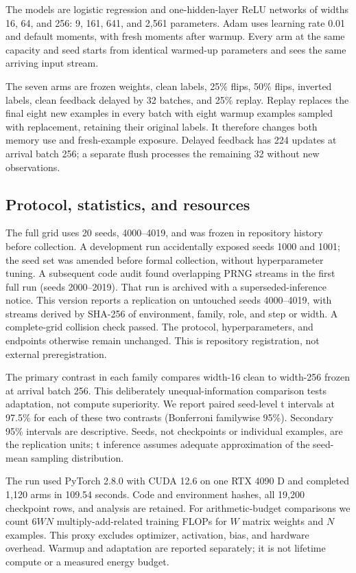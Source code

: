 \documentclass[11pt]{article}
\begin{document}
The models are logistic regression and one-hidden-layer ReLU networks of
widths 16, 64, and 256: 9, 161, 641, and 2,561 parameters. Adam uses learning
rate 0.01 and default moments, with fresh moments after warmup. Every arm at
the same capacity and seed starts from identical warmed-up parameters and
sees the same arriving input stream.

The seven arms are frozen weights, clean labels, 25\% flips, 50\% flips,
inverted labels, clean feedback delayed by 32 batches, and 25\% replay.
Replay replaces the final eight new examples in every batch with eight
warmup examples sampled with replacement, retaining their original labels.
It therefore changes both memory use and fresh-example exposure. Delayed
feedback has 224 updates at arrival batch 256; a separate flush processes
the remaining 32 without new observations.

\subsection{Protocol, statistics, and resources}
The full grid uses 20 seeds, 4000--4019, and was frozen in repository history
before collection. A development run accidentally exposed seeds 1000 and 1001;
the seed set was amended before formal collection, without hyperparameter
tuning. A subsequent code audit found overlapping PRNG streams in the first
full run (seeds 2000--2019). That run is archived with a superseded-inference
notice. This version reports a replication on untouched seeds 4000--4019,
with streams derived by SHA-256 of environment, family, role, and step or
width. A complete-grid collision check passed. The protocol, hyperparameters,
and endpoints otherwise remain unchanged. This is repository registration,
not external preregistration.

The primary contrast in each family compares width-16 clean to width-256
frozen at arrival batch 256. This deliberately unequal-information comparison
tests adaptation, not compute superiority. We report paired seed-level t
intervals at 97.5\% for each of these two contrasts (Bonferroni familywise
95\%). Secondary 95\% intervals are descriptive. Seeds, not checkpoints or
individual examples, are the replication units; t inference assumes adequate
approximation of the seed-mean sampling distribution.

The run used PyTorch 2.8.0 with CUDA 12.6 on one RTX 4090 D and completed
1,120 arms in 109.54 seconds. Code and environment hashes, all 19,200
checkpoint rows, and analysis are retained. For arithmetic-budget comparisons
we count $6WN$ multiply-add-related training FLOPs for $W$ matrix weights
and $N$ examples. This proxy excludes optimizer, activation, bias, and hardware
overhead. Warmup and adaptation are reported separately; it is not lifetime
compute or a measured energy budget.
\end{document}
